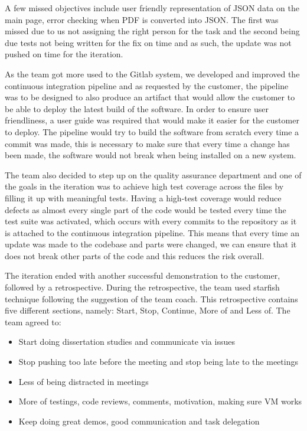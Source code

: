 \documentclass{l3proj}
\begin{document}
A few missed objectives include user friendly representation of JSON data on the main page, error checking when PDF is converted into JSON. The first was missed due to us not assigning the right person for the task and the second being due tests not being written for the fix on time and as such, the update was not pushed on time for the iteration.

As the team got more used to the Gitlab system, we developed and improved the continuous integration pipeline and as requested by the customer, the pipeline was to be designed to also produce an artifact that would allow the customer to be able to deploy the latest build of the software. In order to ensure user friendliness, a user guide was required that would make it easier for the customer to deploy. The pipeline would try to build the software from scratch every time a commit was made, this is necessary to make sure that every time a change has been made, the software would not break when being installed on a new system.

The team also decided to step up on the quality assurance department and one of the goals in the iteration was to achieve high test coverage across the files by filling it up with meaningful tests. Having a high-test coverage would reduce defects as almost every single part of the code would be tested every time the test suite was activated, which occurs with every commits to the repository as it is attached to the continuous integration pipeline. This means that every time an update was made to the codebase and parts were changed, we can ensure that it does not break other parts of the code and this reduces the risk overall.

The iteration ended with another successful demonstration to the customer, followed by a retrospective. During the retrospective, the team used starfish technique following the suggestion of the team coach. This retrospective contains five different sections, namely: Start, Stop, Continue, More of and Less of. The team agreed to:

\begin{itemize}
\item Start doing dissertation studies and communicate via issues
\item Stop pushing too late before the meeting and stop being late to the meetings
\item Less of being distracted in meetings
\item More of testings, code reviews, comments, motivation, making sure VM works
\item Keep doing great demos, good communication and task delegation
\end{itemize}
\end{document}
